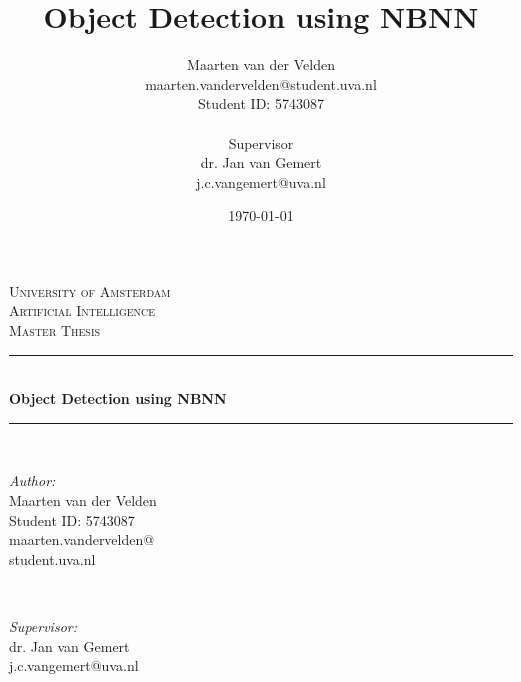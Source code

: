 \documentclass[a4paper,10pt]{report}
\title{Object Detection using NBNN}
\author{Maarten van der Velden\\maarten.vandervelden@student.uva.nl\\Student ID: 5743087\\ \\Supervisor\\dr. Jan van Gemert\\j.c.vangemert@uva.nl}
\date{\today}
\begin{document}
\begin{titlepage}

\newcommand{\HRule}{\rule{\linewidth}{0.5mm}} %

\center %
 

\textsc{\LARGE University of Amsterdam}\\[1.5cm] %
\textsc{\Large Artificial Intelligence}\\[0.5cm] %
\textsc{\large Master Thesis}\\[0.5cm] %


\HRule \\[0.4cm]
{ \huge \bfseries Object Detection using NBNN}\\[0.4cm] %
\HRule \\[1.5cm]
 

\begin{minipage}{0.4\textwidth}
\begin{flushleft} \large
\emph{Author:}\\
Maarten van der Velden\\
Student ID: 5743087\\
maarten.vandervelden@\\student.uva.nl
\end{flushleft}
\end{minipage}
~
\begin{minipage}{0.4\textwidth}
\begin{flushright} \large
\emph{Supervisor:} \\
dr. Jan van Gemert\\
j.c.vangemert@uva.nl
\end{flushright}
\end{minipage}\\[4cm]


\end{titlepage}
\end{document}
